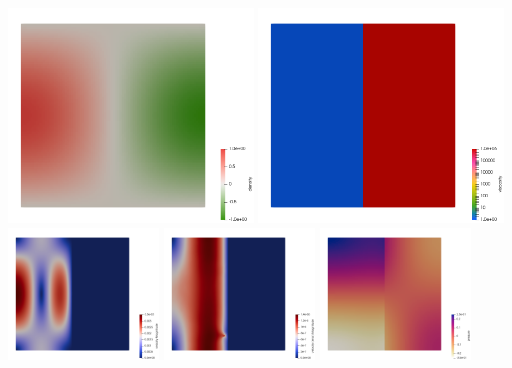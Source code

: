 \begin{center}
\includegraphics[width=6.5cm]{python_codes/fieldstone_05/results/rho}
\includegraphics[width=6.5cm]{python_codes/fieldstone_05/results/eta}\\
\includegraphics[width=4cm]{python_codes/fieldstone_05/results/vel}
\includegraphics[width=4cm]{python_codes/fieldstone_05/results/vel_error}
\includegraphics[width=4cm]{python_codes/fieldstone_05/results/press}

\end{center}
